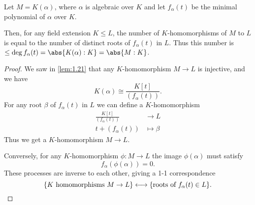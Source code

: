 \documentclass{article}
\begin{document}
\begin{nlemma}\label{lem:2.6}
    Let $M = K(\alpha)$, where $\alpha$ is algebraic over $K$ and let $f_\alpha(t)$ be the minimal polynomial of $\alpha$ over $K$.

    Then, for any field extension $K \leq L$, the number of $K$-homomorphisms of $M$ to $L$ is equal to the number of distinct roots of $f_\alpha(t)$ in $L$.
    Thus this number is $\leq \deg f_\alpha(t) = \abs{K(\alpha):K} = \abs{M:K}$.

    \begin{center}
    \end{center}
\end{nlemma}
\begin{proof}
    We saw in \cref{lem:1.21} that any $K$-homomorphism $M \to L$ is injective, and we have
    \begin{equation*}
        K(\alpha) \cong \frac{K[t]}{(f_\alpha(t))}.
    \end{equation*}
    For any root $\beta$ of $f_\alpha(t)$ in $L$ we can define a $K$-homomorphism
    \begin{align*}
        \frac{K[t]}{(f_\alpha(t))} &\to L \\
        t + (f_\alpha(t)) &\mapsto \beta
    \end{align*}
    Thus we get a $K$-homomorphism $M \to L$.

    Conversely, for any $K$-homomorphism $\phi:M \to L$ the image $\phi(\alpha)$ must satisfy
    \begin{equation*}f_\alpha(\phi(\alpha)) = 0.\end{equation*}
    These processes are inverse to each other, giving a 1-1 correspondence
    \begin{equation*}
        \{K \text{ homomorphisms } M \to L\} \longleftrightarrow \{\text{roots of } f_\alpha(t) \in L\}. \qedhere
    \end{equation*}
\end{proof}
\end{document}

